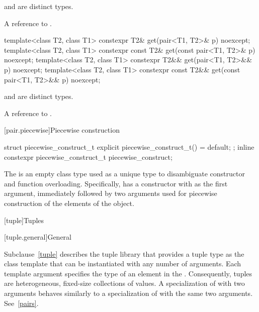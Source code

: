 \begin{itemdescr}
\pnum
\mandates
{} and  are distinct types.

\pnum
\returns
A reference to .
\end{itemdescr}

%
\begin{itemdecl}
template<class T2, class T1>
  constexpr T2& get(pair<T1, T2>& p) noexcept;
template<class T2, class T1>
  constexpr const T2& get(const pair<T1, T2>& p) noexcept;
template<class T2, class T1>
  constexpr T2&& get(pair<T1, T2>&& p) noexcept;
template<class T2, class T1>
  constexpr const T2&& get(const pair<T1, T2>&& p) noexcept;
\end{itemdecl}

\begin{itemdescr}
\pnum
\mandates
{} and  are distinct types.

\pnum
\returns
A reference to .
\end{itemdescr}

[pair.piecewise]{Piecewise construction}

%
%
\begin{itemdecl}
struct piecewise_construct_t {
  explicit piecewise_construct_t() = default;
};
inline constexpr piecewise_construct_t piecewise_construct{};
\end{itemdecl}

\pnum
The   is an empty class type
used as a unique type to disambiguate constructor and function overloading. Specifically,
 has a constructor with  as the
first argument, immediately followed by two  arguments used
for piecewise construction of the elements of the  object.

[tuple]{Tuples}

[tuple.general]{General}

\pnum
{}%
Subclause~\ref{tuple} describes the tuple library that provides a tuple type as
the class template  that can be instantiated with any number
of arguments. Each template argument specifies
the type of an element in the .  Consequently, tuples are
heterogeneous, fixed-size collections of values. A specialization of  with
two arguments behaves similarly to a specialization of  with the same two arguments.
See~\ref{pairs}.

